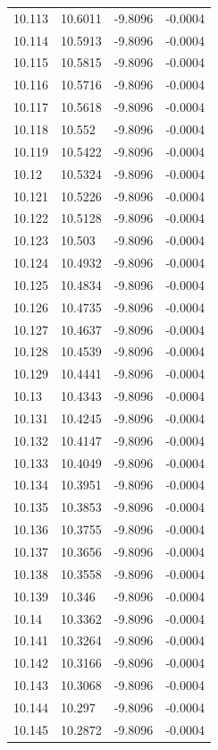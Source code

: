 \begin{tabular}{llll}
10.113 & 10.6011 & -9.8096 & -0.0004 \\
10.114 & 10.5913 & -9.8096 & -0.0004 \\
10.115 & 10.5815 & -9.8096 & -0.0004 \\
10.116 & 10.5716 & -9.8096 & -0.0004 \\
10.117 & 10.5618 & -9.8096 & -0.0004 \\
10.118 & 10.552 & -9.8096 & -0.0004 \\
10.119 & 10.5422 & -9.8096 & -0.0004 \\
10.12 & 10.5324 & -9.8096 & -0.0004 \\
10.121 & 10.5226 & -9.8096 & -0.0004 \\
10.122 & 10.5128 & -9.8096 & -0.0004 \\
10.123 & 10.503 & -9.8096 & -0.0004 \\
10.124 & 10.4932 & -9.8096 & -0.0004 \\
10.125 & 10.4834 & -9.8096 & -0.0004 \\
10.126 & 10.4735 & -9.8096 & -0.0004 \\
10.127 & 10.4637 & -9.8096 & -0.0004 \\
10.128 & 10.4539 & -9.8096 & -0.0004 \\
10.129 & 10.4441 & -9.8096 & -0.0004 \\
10.13 & 10.4343 & -9.8096 & -0.0004 \\
10.131 & 10.4245 & -9.8096 & -0.0004 \\
10.132 & 10.4147 & -9.8096 & -0.0004 \\
10.133 & 10.4049 & -9.8096 & -0.0004 \\
10.134 & 10.3951 & -9.8096 & -0.0004 \\
10.135 & 10.3853 & -9.8096 & -0.0004 \\
10.136 & 10.3755 & -9.8096 & -0.0004 \\
10.137 & 10.3656 & -9.8096 & -0.0004 \\
10.138 & 10.3558 & -9.8096 & -0.0004 \\
10.139 & 10.346 & -9.8096 & -0.0004 \\
10.14 & 10.3362 & -9.8096 & -0.0004 \\
10.141 & 10.3264 & -9.8096 & -0.0004 \\
10.142 & 10.3166 & -9.8096 & -0.0004 \\
10.143 & 10.3068 & -9.8096 & -0.0004 \\
10.144 & 10.297 & -9.8096 & -0.0004 \\
10.145 & 10.2872 & -9.8096 & -0.0004 \\

\end{tabular}
